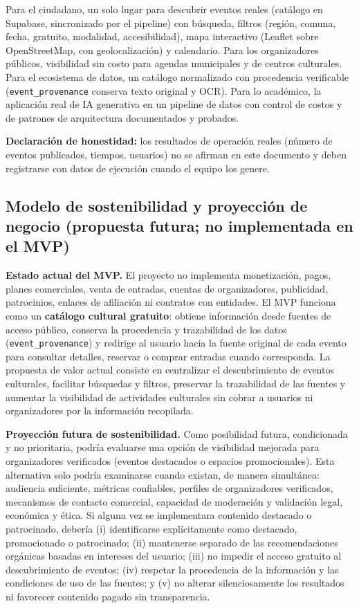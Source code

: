 Para el ciudadano, un solo lugar para descubrir eventos reales (catálogo en
Supabase, sincronizado por el pipeline) con búsqueda, filtros (región, comuna, fecha,
gratuito, modalidad, accesibilidad), mapa interactivo (Leaflet sobre OpenStreetMap,
con geolocalización) y calendario. Para los
organizadores públicos, visibilidad sin costo para agendas municipales y de centros
culturales. Para el ecosistema de datos, un catálogo normalizado con procedencia
verificable (\texttt{event\_provenance} conserva texto original y OCR). Para lo académico,
la aplicación real de IA generativa en un pipeline de datos con control de costos y de
patrones de arquitectura documentados y probados.

\textcolor{rojo}{\textbf{Declaración de honestidad:}} los resultados de operación reales
(número de eventos publicados, tiempos, usuarios) no se afirman en este documento y deben
registrarse con datos de ejecución cuando el equipo los genere.

\subsection{Modelo de sostenibilidad y proyección de negocio (propuesta futura; no implementada en el MVP)}

\textbf{Estado actual del MVP.} El proyecto no implementa monetización, pagos, planes
comerciales, venta de entradas, cuentas de organizadores, publicidad, patrocinios,
enlaces de afiliación ni contratos con entidades. El MVP funciona como un \textbf{catálogo
cultural gratuito}: obtiene información desde fuentes de acceso público, conserva la
procedencia y trazabilidad de los datos (\texttt{event\_provenance}) y redirige al usuario
hacia la fuente original de cada evento para consultar detalles, reservar o comprar
entradas cuando corresponda. La propuesta de valor actual consiste en centralizar el
descubrimiento de eventos culturales, facilitar búsquedas y filtros, preservar la
trazabilidad de las fuentes y aumentar la visibilidad de actividades culturales sin
cobrar a usuarios ni organizadores por la información recopilada.

\textbf{Proyección futura de sostenibilidad.} Como posibilidad futura, condicionada y no
prioritaria, podría evaluarse una opción de visibilidad mejorada para organizadores
verificados (eventos destacados o espacios promocionales). Esta alternativa solo podría
examinarse cuando existan, de manera simultánea: audiencia suficiente, métricas
confiables, perfiles de organizadores verificados, mecanismos de contacto comercial,
capacidad de moderación y validación legal, económica y ética. Si alguna vez se
implementara contenido destacado o patrocinado, debería (i) identificarse explícitamente
como destacado, promocionado o patrocinado; (ii) mantenerse separado de las
recomendaciones orgánicas basadas en intereses del usuario; (iii) no impedir el acceso
gratuito al descubrimiento de eventos; (iv) respetar la procedencia de la información y
las condiciones de uso de las fuentes; y (v) no alterar silenciosamente los resultados
ni favorecer contenido pagado sin transparencia.

